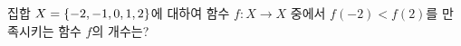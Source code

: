 집합 $X=\{-2{,}\mkern3mu\mathopen{}-1{,}\mkern3mu\mathopen{}0{,}\mkern3mu\mathopen{}1{,}\mkern3mu\mathopen{}2\}$에 대하여 함수 $f:X\longrightarrow X$ 중에서 $f(-2)<f(2)$를 만족시키는 함수 $f$의 개수는?

